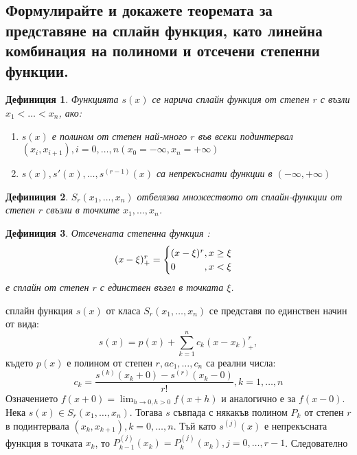 \documentclass[12pt]{article}
\numberwithin{equation}{subsection}
\newtheorem{definition}{Дефиниция}
\numberwithin{theorem}{subsection}
\numberwithin{definition}{subsection}
\numberwithin{corollary}{subsection}
\begin{document}
\subsection{Формулирайте и докажете теоремата за представяне на сплайн функция,
като линейна комбинация на полиноми и отсечени степенни функции.}
  \begin{definition}
    Функцията $s(x)$ се нарича сплайн функция от степен $r$ с възли $x_1<\ldots<x_n$, ако:
    \begin{enumerate}
      \item{$s(x)$ е полином от степен най-много $r$ във всеки подинтервал $(x_i,x_{i+1}), i=0,\ldots,n (x_0=-\infty,x_n=+\infty)$}
      \item{$s(x), s'(x), \ldots, s^{(r-1)}(x)$} са непрекъснати функции в $(-\infty, +\infty)$
    \end{enumerate}
  \end{definition}
  \begin{definition}
    $S_r(x_1,\ldots,x_n)$ отбелязва множеството от сплайн-функции от степен $r$ свъзли в точките $x_1,\ldots,x_n$. 
  \end{definition}
  \begin{definition}
    Отсечената степенна функция :
    \begin{equation*}
      (x-\xi)^r_+=\begin{cases}
                    (x-\xi)^r\hfill, x\geq\xi\\
                    0\hfill,x<\xi
                  \end{cases}
    \end{equation*}
    е сплайн от степен $r$ с единствен възел в точката $\xi$.
  \end{definition}
   сплайн функция $s(x)$ от класа $S_r(x_1,\ldots,x_n)$ се представя по единствен начин от вида:
  \begin{equation}\label{spline}
    s(x)=p(x)+\sum_{k=1}^{n}c_k(x-x_k)_+^r,
  \end{equation}
  където $p(x)$ е полином от степен $r, a c_1,\ldots,c_n$ са реални числа:
  \begin{equation}
    c_k=\frac{s^{(k)}(x_k+0)-s^{(r)}(x_k-0)}{r!}, k=1,\ldots,n
  \end{equation}
  \proof
  Означението $f(x+0)=\lim_{h\to0,h>0}f(x+h)$ и аналогично е за $f(x-0)$.
  Нека $s(x)\in S_r(x_1,\ldots,x_n).$ Тогава $s$ съвпада с някакъв полином $P_k$ от степен $r$ в подинтервала $(x_k, x_{k+1}), k=0,\ldots,n$. Тъй като $s^{(j)}(x)$ е непрекъсната функция в точката $x_k$, то $P^{(j)}_{k-1}(x_k)=P_{k}^{(j)}(x_k), j=0,\ldots,r-1$. Следователно
\end{document}
